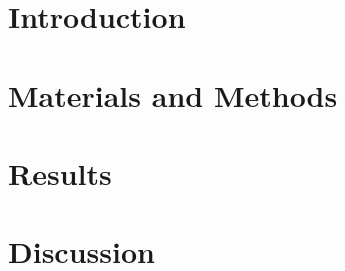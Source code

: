 



\begin{abstract}
	
% 
    
    {\Huge A flexible fluid delivery system for rodent behavior experiments}
	\\ \\ \\
	
	\\
	\\
	\\
	
\end{abstract}



\section*{Introduction}\label{s:introduction}


\section*{Materials and Methods}\label{s:methods}


\section*{Results}\label{s:results}


\section*{Discussion}\label{s:discussion}




